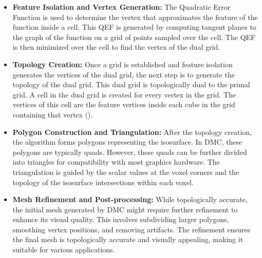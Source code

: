 \begin{itemize}
\item \textbf{Feature Isolation and Vertex Generation:}
The Quadratic Error Function is used to determine the vertex that approximates the feature of the function inside a cell. This QEF is generated by computing tangent planes to the graph of the function on a grid of points sampled over the cell. The QEF is then minimized over the cell to find the vertex of the dual grid.

\item \textbf{Topology Creation:}
Once a grid is established and feature isolation generates the vertices of the dual grid, the next step is to generate the topology of the dual grid. This dual grid is topologically dual to the primal grid. A cell in the dual grid is created for every vertex in the grid. The vertices of this cell are the feature vertices inside each cube in the grid containing that vertex (\cite{Schaefer_2004}).

\item \textbf{Polygon Construction and Triangulation:}
After the topology creation, the algorithm forms polygons representing the isosurface. In DMC, these polygons are typically quads. However, these quads can be further divided into triangles for compatibility with most graphics hardware. The triangulation is guided by the scalar values at the voxel corners and the topology of the isosurface intersections within each voxel.

\item \textbf{Mesh Refinement and Post-processing:}
While topologically accurate, the initial mesh generated by DMC might require further refinement to enhance its visual quality. This involves subdividing larger polygons, smoothing vertex positions, and removing artifacts. The refinement ensures the final mesh is topologically accurate and visually appealing, making it suitable for various applications.
\end{itemize}

\vspace{2mm}
